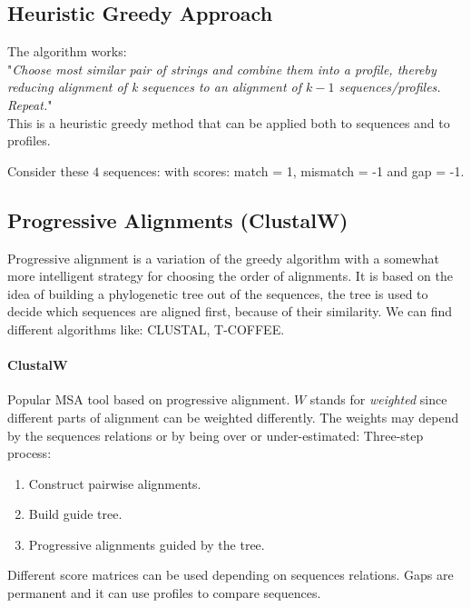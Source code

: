 \subsection{Heuristic Greedy Approach}
The algorithm works:\\ 
"\textit{Choose most similar pair of strings and combine them into a profile, thereby reducing alignment of k sequences to an alignment of $k-1$ sequences/profiles. Repeat.}"\\

This is a heuristic greedy method that can be applied both to sequences and to profiles.

Consider these $4$ sequences:
with scores: match = 1, mismatch = -1 and gap = -1.



\subsection{Progressive Alignments (ClustalW)}
Progressive alignment is a variation of the greedy algorithm with a somewhat more intelligent strategy for choosing the order of alignments. It is based on the idea of building a phylogenetic tree out of the sequences, the tree is used to decide which sequences are aligned first, because of their similarity. We can find different algorithms like: CLUSTAL, T-COFFEE.

\paragraph{ClustalW}
Popular MSA tool based on progressive alignment. $W$ stands for \textit{weighted} since different parts of alignment can be weighted differently. The weights may depend by the sequences relations or by being over or under-estimated: Three-step process:
\begin{enumerate}
	\item Construct pairwise alignments.
	\item Build guide tree.
	\item Progressive alignments guided by the tree.
\end{enumerate}
Different score matrices can be used depending on sequences relations. Gaps are permanent and it can use profiles to compare sequences.\\

